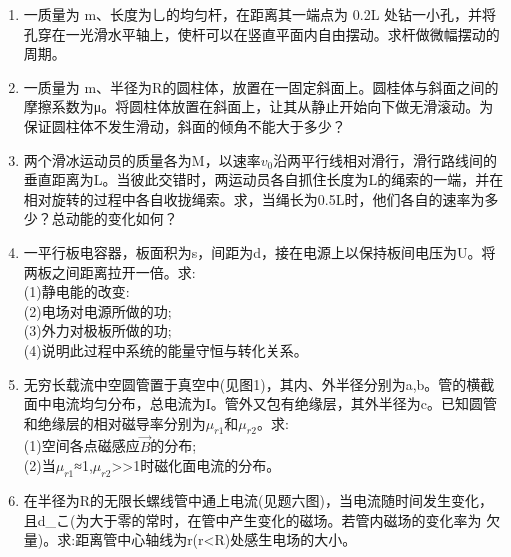 \begin{enumerate}
\item 一质量为 m、长度为乚的均匀杆，在距离其一端点为 0.2L 处钻一小孔，并将孔穿在一光滑水平轴上，使杆可以在竖直平面内自由摆动。求杆做微幅摆动的周期。
\item 一质量为 m、半径为R的圆柱体，放置在一固定斜面上。圆桂体与斜面之间的摩擦系数为μ。将圆柱体放置在斜面上，让其从静止开始向下做无滑滚动。为保证圆柱体不发生滑动，斜面的倾角不能大于多少？
\item 两个滑冰运动员的质量各为M，以速率$v_0$沿两平行线相对滑行，滑行路线间的垂直距离为L。当彼此交错时，两运动员各自抓住长度为L的绳索的一端，并在相对旋转的过程中各自收拢绳索。求，当绳长为0.5L时，他们各自的速率为多少？总动能的变化如何？
\item 一平行板电容器，板面积为s，间距为d，接在电源上以保持板间电压为U。将两板之间距离拉开一倍。求:\\(1)静电能的改变:\\(2)电场对电源所做的功;\\(3)外力对极板所做的功;\\(4)说明此过程中系统的能量守恒与转化关系。
\item 无穷长载流中空圆管置于真空中(见图1)，其内、外半径分别为a,b。管的横截面中电流均匀分布，总电流为I。管外又包有绝缘层，其外半径为c。已知圆管和绝缘层的相对磁导率分别为$\mu_{r1}$和$\mu_{r2}$。求:\\
(1)空间各点磁感应$\vec B$的分布;\\
(2)当$\mu_{r1}$≈1,$\mu_{r2}$>>1时磁化面电流的分布。
\item 在半径为R的无限长螺线管中通上电流(见题六图)，当电流随时间发生变化，且d_こ(为大于零的常时，在管中产生变化的磁场。若管内磁场的变化率为
欠量)。求:距离管中心轴线为r(r<R)处感生电场的大小。
\end{enumerate}

